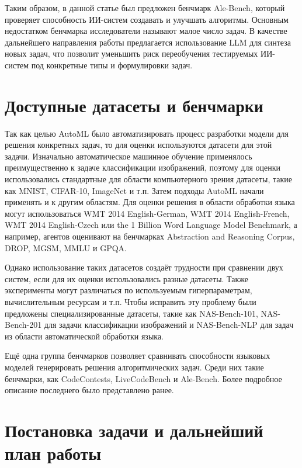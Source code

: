 \documentclass[a4paper,14pt]{extarticle}
\begin{document}
    Таким образом, в данной статье был предложен бенчмарк Ale-Bench, который проверяет способность ИИ-систем создавать и улучшать алгоритмы.
    Основным недостатком бенчмарка исследователи называют малое число задач.
    В качестве дальнейшего направления работы предлагается использование LLM для синтеза новых задач, что позволит уменьшить риск переобучения тестируемых ИИ-систем под конкретные типы и формулировки задач.
    
\newpage
\section{Доступные датасеты и бенчмарки}
    Так как целью AutoML было автоматизировать процесс разработки модели для решения конкретных задач, то для оценки используются датасети для этой задачи.
    Изначально автоматическое машинное обучение применялось преимущественно к задаче классификации изображений, поэтому для оценки использовались стандартные для области компьютерного зрения датасеты, такие как MNIST, CIFAR-10, ImageNet и т.п.
    Затем подходы AutoML начали применять и к другим областям.
    Для оценки решения в области обработки языка могут использоваться WMT 2014 English-German, WMT 2014 English-French, WMT 2014 English-Czech или the 1 Billion Word Language Model Benchmark, а например, агентов оценивают на бенчмарках Abstraction and Reasoning Corpus, DROP, MGSM, MMLU и GPQA.

    Однако использование таких датасетов создаёт трудности при сравнении двух систем, если для их оценки использовались разные датасеты.
    Также эксперименты могут различаться по используемым гиперпараметрам, вычислительным ресурсам и т.п.
    Чтобы исправить эту проблему были предложены специализированные датасеты, такие как NAS-Bench-101, NAS-Bench-201 для задачи классификации изображений и NAS-Bench-NLP для задач из области автоматической обработки языка.
    
    Ещё одна группа бенчмарков позволяет сравнивать способности языковых моделей генерировать решения алгоритмических задач.
    Среди них такие бенчмарки, как CodeContests, LiveCodeBench и Ale-Bench.
    Более подробное описание последнего было представлено ранее. 

\section{Постановка задачи и дальнейший план работы}
\end{document}
